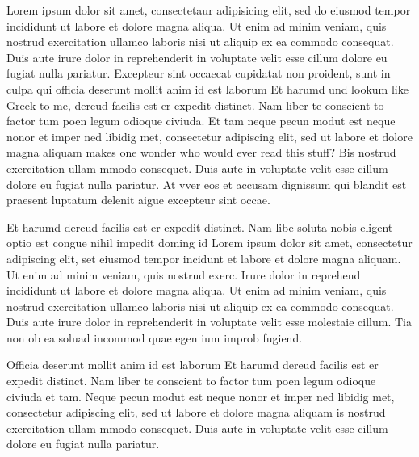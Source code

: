 \documentclass[12pt]{report}
\begin{document}

\maketitle


Lorem ipsum dolor sit amet, consectetaur adipisicing elit, sed do
eiusmod tempor incididunt ut labore et dolore magna aliqua.  Ut enim ad
minim veniam, quis nostrud exercitation ullamco laboris nisi ut
aliquip ex ea commodo consequat.  Duis aute irure dolor in
reprehenderit in voluptate velit esse cillum dolore eu fugiat nulla
pariatur.  Excepteur sint occaecat cupidatat non proident, sunt in
culpa qui officia deserunt mollit anim id est laborum Et harumd und
lookum like Greek to me, dereud facilis est er expedit distinct.  Nam
liber te conscient to factor tum poen legum odioque civiuda.  Et tam
neque pecun modut est neque nonor et imper ned libidig met,
consectetur adipiscing elit, sed ut labore et dolore magna aliquam
makes one wonder who would ever read this stuff? Bis nostrud
exercitation ullam mmodo consequet.  Duis aute in voluptate velit esse
cillum dolore eu fugiat nulla pariatur.  At vver eos et accusam
dignissum qui blandit est praesent luptatum delenit aigue excepteur
sint occae. 

Et harumd dereud facilis est er expedit distinct.  Nam libe soluta
nobis eligent optio est congue nihil impedit doming id Lorem ipsum
dolor sit amet, consectetur adipiscing elit, set eiusmod tempor
incidunt et labore et dolore magna aliquam.  Ut enim ad minim veniam,
quis nostrud exerc.  Irure dolor in reprehend incididunt ut labore et
dolore magna aliqua.  Ut enim ad minim veniam, quis nostrud
exercitation ullamco laboris nisi ut aliquip ex ea commodo consequat.
Duis aute irure dolor in reprehenderit in voluptate velit esse
molestaie cillum.  Tia non ob ea soluad incommod quae egen ium improb
fugiend.

\begin{danger}
Officia deserunt mollit anim id est laborum Et harumd dereud facilis
est er expedit distinct.  Nam liber te conscient to factor tum poen
legum odioque civiuda et tam.  Neque pecun modut est neque nonor et
imper ned libidig met, consectetur adipiscing elit, sed ut labore et
dolore magna aliquam is nostrud exercitation ullam mmodo consequet.
Duis aute in voluptate velit esse cillum dolore eu fugiat nulla
pariatur.
\end{danger}
\end{document}
